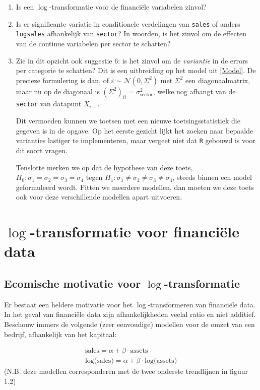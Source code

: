 \documentclass[a4paper]{report}
\begin{document}
  \begin{enumerate}
  \item Is een $\log$-transformatie voor de financi\"ele variabelen zinvol?
  
  \item Is er significante variatie in conditionele verdelingen van \verb!sales! of anders \verb!logsales! afhankelijk van \verb!sector!? In woorden, is het zinvol om de effecten van de continue variabelen per sector te schatten?
  
  \item Zie in dit opzicht ook suggestie 6: is het zinvol om de \emph{variantie} in de errors per categorie te schatten? Dit is een uitbreiding op het model uit \ref{Model}. De precieze formulering is dan, of $\varepsilon \sim \mathcal{N}(0,\Sigma^2)$ met $\Sigma^2$ een diagonaalmatrix, maar nu op de diagonaal is $(\Sigma^2)_{ii} = \sigma^2_{\text{sector}}$, welke nog afhangt van de \verb!sector! van datapunt $X_{i-}$. 
  
  Dit vermoeden kunnen we toetsen met een nieuwe toetsingsstatistiek die gegeven is in de opgave. Op het eerste gezicht lijkt het zoeken naar bepaalde varianties lastiger te implementeren, maar vergeet niet dat \verb!R! gebouwd is voor dit soort vragen.
  
  Tenslotte merken we op dat de hypothese van deze toets, $H_0:\sigma_1=\sigma_2=\sigma_3=\sigma_4$ tegen $H_1: \sigma_1
  \neq \sigma_2 \neq \sigma_3 \neq \sigma_4$, steeds binnen een model geformuleerd wordt. Fitten we meerdere modellen, dan moeten we deze toets ook voor deze verschillende modellen apart uitvoeren.
  \end{enumerate}
  
\chapter{$\log$-transformatie voor financi\"ele data}
\section{Ecomische motivatie voor $\log$-transformatie}
  Er bestaat een heldere motivatie voor het $\log$-transformeren van financi\"ele data. In het geval van financi\"ele data zijn afhankelijkheden veelal ratio en niet additief. Beschouw immers de volgende (zeer eenvoudige) modellen voor de omzet van een bedrijf, afhankelijk van het kapitaal:

\begin{align}
  \text{sales} = \alpha + \beta \cdot \text{assets} \\
  \text{log(sales)} = \alpha + \beta \cdot \text{log(assets)}
\end{align}
  (N.B. deze modellen corresponderen met de twee onderste trendlijnen in figuur 1.2)
  
\end{document}
